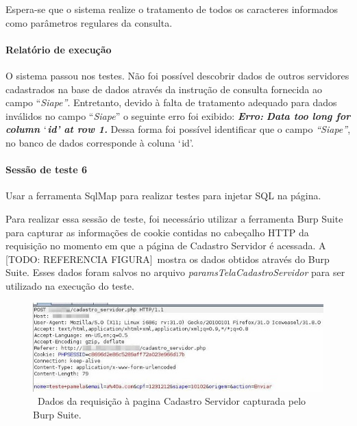 \documentclass[
    12pt,               %
    openright,          %
    oneside,            %
    a4paper,            %
    section=TITLE,     %
    english,            %
    french,             %
    spanish,            %
    brazil              %
    ]{abntex2}
\begin{document}
Espera-se que o sistema realize o tratamento de todos os caracteres informados como parâmetros regulares da consulta.



\paragraph*{Relatório de execução}

O sistema passou nos testes. Não foi possível descobrir dados de outros servidores cadastrados na base de dados através da instrução de consulta fornecida ao campo \textquotedblleft{}\emph{Siape\textquotedblright{}}. Entretanto, devido à falta de tratamento adequado para dados inválidos no campo \textquotedblleft{}\emph{Siape}\textquotedblright{} o seguinte erro foi exibido: \textbf{\emph{Erro:}}\textbf{\emph{ Data too long for column $\lq$id\rq{} at row 1. }}Dessa forma foi possível identificar que o campo \emph{\textquotedblleft{}Siape\textquotedblright{}}, no banco de dados corresponde à coluna $\lq$id\rq{}.



\paragraph*{Sessão de teste 6}

Usar a ferramenta SqlMap para realizar testes para injetar SQL na página.


Para realizar essa sessão de teste, foi necessário utilizar a ferramenta Burp Suite para capturar as informações de cookie contidas no cabeçalho HTTP da requisição no momento em que a página de Cadastro Servidor é acessada. A {[}TODO: REFERENCIA FIGURA{]}~mostra os dados obtidos através do Burp Suite. Esses dados foram salvos no arquivo \emph{paramsTelaCadastroServidor} para ser utilizado na execução do teste.





\begin{figure}[htp]
\centering
\caption{~Dados da requisição à pagina Cadastro Servidor capturada pelo Burp Suite.}
\includegraphics[width=450px]{imagem27Editada.jpeg}
\end{figure}
\ifdefined\FloatBarrier \FloatBarrier \fi
\end{document}
